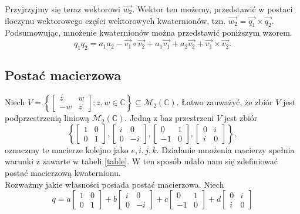 \documentclass[a4paper,twoside,11pt,reqno]{mwrep}
\theoremstyle{plain} \newtheorem{twr}{Twierdzenie}
\theoremstyle{plain} \newtheorem{lem}{Lemat}
\theoremstyle{definition} \newtheorem{defi}{Definicja}
\theoremstyle{remark} \newtheorem*{wni}{Wniosek}
\theoremstyle{definition} \newtheorem{uwaga}{Uwaga}
\theoremstyle{definition}\newtheorem{prz}{Przykład}
\begin{document}
Przyjrzyjmy się teraz wektorowi $\overrightarrow{w_2}$. Wektor ten możemy, przedstawić
w postaci iloczynu wektorowego części wektorowych kwaternionów, tzn. 
$\overrightarrow{w_2} = \overrightarrow{q_1}\times\overrightarrow{q_2}$.\\
\indent
Podsumowując, mnożenie kwaternionów można przedstawić poniższym wzorem.
$$q_1q_2 = a_1a_2-\overrightarrow{v_1}\circ \overrightarrow{v_2}+a_1\overrightarrow{v_1}+a_2\overrightarrow{v_2}+\overrightarrow{v_1}\times \overrightarrow{v_2}.$$   
\subsection{Postać macierzowa}
Niech $V = \left\lbrace \begin{bmatrix}
	z&w\\
	-\overline{w}& \overline{z}
\end{bmatrix}: z,w \in \mathbb{C}\right\rbrace \subseteq
 \mathcal{M}_2\left(\mathbb{C}\right)$. 
Łatwo zauważyć, że zbiór $V$ jest podprzestrzenią liniową 
$\mathcal{M}_2\left(\mathbb{C}\right)$.
Jedną z baz przestrzeni $V$ jest zbiór 
$$\left\lbrace \begin{bmatrix}
	1&0\\
	0& 1
\end{bmatrix},
\begin{bmatrix}
	i&0\\
	0& -i
\end{bmatrix},
\begin{bmatrix}
	0&1\\
	-1& 0
\end{bmatrix},
\begin{bmatrix}
	0&i\\
	i& 0
\end{bmatrix}\right\rbrace,$$
oznaczmy te macierze kolejno jako $e,i,j,k$. Działanie mnożenia macierzy spełnia warunki z 
zawarte w tabeli \ref{table}. W ten sposób udało nam się zdefiniować postać macierzową
kwaternionu.\\
\indent
Rozważmy jakie własności posiada postać macierzowa. Niech
$$ q=a\begin{bmatrix}
	1&0\\
	0& 1
\end{bmatrix}+
b\begin{bmatrix}
	i&0\\
	0& -i
\end{bmatrix}+
c\begin{bmatrix}
	0&1\\
	-1& 0
\end{bmatrix}+
d\begin{bmatrix}
	0&i\\
	i& 0
\end{bmatrix}$$
\end{document}
